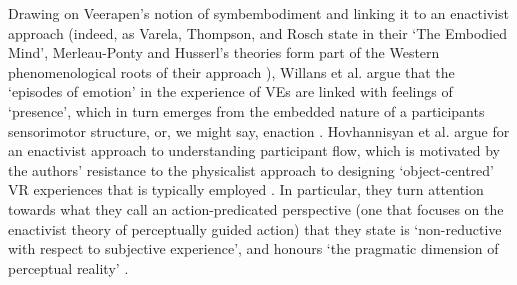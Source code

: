 Drawing on Veerapen's notion of symbembodiment and linking it to an enactivist approach (indeed, as Varela, Thompson, and Rosch state in their `The Embodied Mind', Merleau-Ponty and Husserl's theories form part of the Western phenomenological roots of their approach \citeyearpar[pp. 173, 18]{varela1993}), Willans et al. argue that the `episodes of emotion' in the experience of VEs are linked with feelings of `presence', which in turn emerges from the embedded nature of a participants sensorimotor structure, or, we might say, enaction \citeyearpar[p. 23]{willans2016}. Hovhannisyan et al. argue for an enactivist approach to understanding participant flow, which is motivated by the authors' resistance to the physicalist approach to designing `object-centred'  VR experiences that is typically employed \citeyearpar[p. 1]{hovhannisyan2019}. In particular, they turn attention towards what they call an action-predicated perspective (one that focuses on the enactivist theory of perceptually guided action) that they state is `non-reductive with respect to subjective experience', and honours `the pragmatic dimension of perceptual reality' \citeyearpar[p. 18]{hovhannisyan2019}. 


